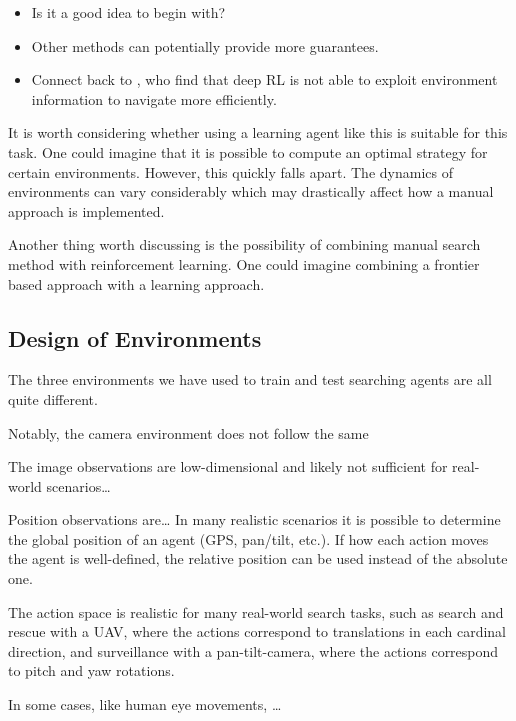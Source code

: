 \begin{itemize}
    \item Is it a good idea to begin with?
    \item Other methods can potentially provide more guarantees.
    \item Connect back to \cite{dhiman_critical_2019}, who find that deep RL is not able to exploit environment information to navigate more efficiently.
\end{itemize}

It is worth considering whether using a learning agent like this is suitable for this task.
One could imagine that it is possible to compute an optimal strategy for certain environments.
However, this quickly falls apart.
The dynamics of environments can vary considerably which may drastically affect how a manual approach is implemented.

Another thing worth discussing is the possibility of combining manual search method with reinforcement learning.
One could imagine combining a frontier based approach with a learning approach.


\subsection{Design of Environments}

The three environments we have used to train and test searching agents are all quite different.

Notably, the camera environment does not follow the same 

The image observations are low-dimensional and likely not sufficient for real-world scenarios\dots

Position observations are\dots
In many realistic scenarios it is possible to determine the global position of an agent (GPS, pan/tilt, etc.).
If how each action moves the agent is well-defined, the relative position can be used instead of the absolute one.

The action space is realistic for many real-world search tasks,
such as search and rescue with a UAV, where the actions correspond to translations in each cardinal direction,
and surveillance with a pan-tilt-camera, where the actions correspond to pitch and yaw rotations.

In some cases, like human eye movements, \dots



